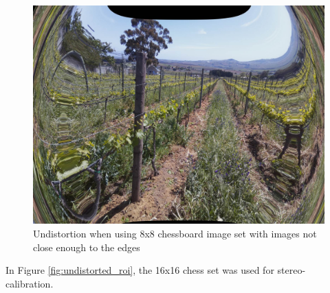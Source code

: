 \begin{figure}[H]
\centering
\includegraphics[scale=0.25]{images/incorrectly_undistorted.jpg}
\caption{Undistortion when using 8x8 chessboard image set with images not close enough to the edges}
\label{fig:incorrectly_undistorted}
\end{figure}

In Figure \ref{fig:undistorted_roi}, the 16x16 chess set was used for stereo-calibration.

